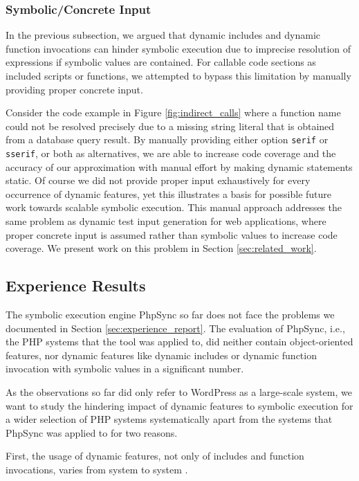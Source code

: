 \documentclass[sigconf, preprint]{acmart}
\renewcommand{\sf}[1]{\textsf{#1}}
\renewcommand{\tt}[1]{\texttt{#1}}
\begin{document}
\subsubsection{Symbolic/Concrete Input}
In the previous subsection, we argued that dynamic includes and dynamic
function invocations can hinder symbolic execution due to imprecise resolution
of expressions if symbolic values are contained. For callable code sections as
included scripts or functions, we attempted to bypass this limitation
by manually providing proper concrete input.

Consider the code example in Figure \ref{fig:indirect_calls} where a function
name could not be resolved precisely due to a missing string literal that is
obtained from a database query result. By manually providing either option
\tt{serif} or \tt{sserif}, or both as alternatives, we are able to increase code coverage and
the accuracy of our approximation with manual effort by making dynamic
statements static. Of course we did not provide proper input exhaustively for
every occurrence of dynamic features, yet this illustrates a basis for possible
future work towards scalable symbolic execution. This manual approach addresses
the same problem as dynamic test input generation for web applications, where
proper concrete input is assumed rather than symbolic values to increase code
coverage. We present work on this problem in Section \ref{sec:related_work}.

\subsection{Experience Results} \label{sec:experience_results}
The symbolic execution engine \sf{PhpSync} \cite{Nguyen:2014:BCG:2635868.2635928} so far does not face the
problems we documented in Section \ref{sec:experience_report}. The evaluation of
\sf{PhpSyn}c, i.e., the PHP systems that the tool was applied to, did neither
contain object-oriented features, nor dynamic features like dynamic includes or dynamic function
invocation with symbolic values in a significant number.
 
As the observations so far did only refer to \sf{WordPress} as a large-scale
system, we want to study the hindering impact of dynamic features to symbolic
execution for a wider selection of PHP systems systematically apart from the
systems that \sf{PhpSync} was applied to for two reasons. 

First, the usage of dynamic features, not only of includes and function invocations, varies from
system to system \cite{hills2015variable}. 
\end{document}
